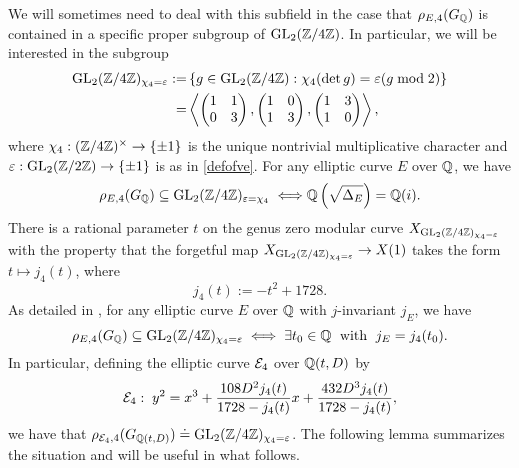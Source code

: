 We will sometimes need to deal with this subfield in the case that $\rho_{E,4}(G_{\mathbb{Q}})$ is contained in a specific proper subgroup of $\operatorname{GL}_2(\mathbb{Z}/4\mathbb{Z})$.  In particular, we will be interested in the subgroup
\begin{equation} \label{defofGL2subchi4equalsve}
\begin{split}
\operatorname{GL}_2(\mathbb{Z}/4\mathbb{Z})_{\chi_4 = \varepsilon} :=& \left\{ g \in \operatorname{GL}_2(\mathbb{Z}/4\mathbb{Z}) : \chi_4(\det g) = \varepsilon(g \bmod 2) \right\} \\
=& \left\langle \begin{pmatrix} 1 & 1 \\ 0 & 3 \end{pmatrix}, \begin{pmatrix} 1 & 0 \\ 1 & 3 \end{pmatrix}, \begin{pmatrix} 1 & 3 \\ 1 & 0 \end{pmatrix} \right\rangle,
\end{split}
\end{equation}
where $\chi_4 : (\mathbb{Z}/4\mathbb{Z})^\times \rightarrow \{ \pm 1 \}$ is the unique nontrivial multiplicative character and $\varepsilon : \operatorname{GL}_2(\mathbb{Z}/2\mathbb{Z}) \rightarrow \{ \pm 1 \}$ is as in \eqref{defofve}.  For any elliptic curve $E$ over $\mathbb{Q}$, we have
\[
\rho_{E,4}(G_{\mathbb{Q}}) \subseteq \operatorname{GL}_2(\mathbb{Z}/4\mathbb{Z})_{\varepsilon = \chi_4} \; \Longleftrightarrow \mathbb{Q}\left( \sqrt{\Delta_E} \right) = \mathbb{Q}(i).
\]
There is a rational parameter $t$ on the genus zero modular curve $X_{\operatorname{GL}_2(\mathbb{Z}/4\mathbb{Z})_{\chi_4 = \varepsilon}}$ with the property that the forgetful map $X_{\operatorname{GL}_2(\mathbb{Z}/4\mathbb{Z})_{\chi_4 = \varepsilon}} \rightarrow X(1)$ takes the form $t \mapsto j_4(t)$, where
\[
j_4(t) := -t^2 + 1728.
\]
As detailed in \cite{sutherlandzywina}, for any elliptic curve $E$ over $\mathbb{Q}$ with $j$-invariant $j_E$, we have
\begin{equation} \label{level4containmentintermsofjinvariant}
\rho_{E,4}(G_{\mathbb{Q}}) \subseteq \operatorname{GL}_2(\mathbb{Z}/4\mathbb{Z})_{\chi_4 = \varepsilon} \; \Longleftrightarrow \; \exists t_0 \in \mathbb{Q} \; \text{ with } \; j_E = j_4(t_0).
\end{equation}
In particular, defining the elliptic curve $\mathcal{E}_4$ over $\mathbb{Q}(t,D)$ by
\begin{equation} \label{level4genericellipticcurve}
\mathcal{E}_4 : \; y^2 = x^3 + \frac{108D^2 j_{4}(t)}{1728 - j_{4}(t)} x + \frac{432D^3 j_{4}(t)}{1728 - j_{4}(t)},
\end{equation}
we have that $\rho_{\mathcal{E}_4,4}(G_{\mathbb{Q}(t,D)}) \doteq \operatorname{GL}_2(\mathbb{Z}/4\mathbb{Z})_{\chi_4 = \varepsilon}$.  The following lemma summarizes the situation and will be useful in what follows.
